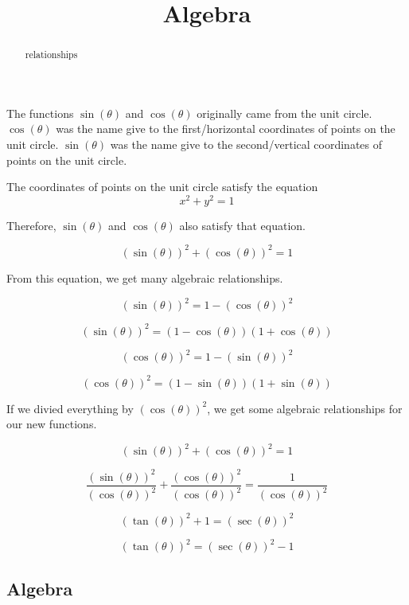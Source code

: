 \documentclass{ximera}
\title{Algebra}
\begin{document}
\begin{abstract}
relationships
\end{abstract}
\maketitle







The functions $\sin(\theta)$ and $\cos(\theta)$ originally came from the unit circle.  $\cos(\theta)$ was the name give to the first/horizontal coordinates of points on the unit circle.   $\sin(\theta)$ was the name give to the second/vertical coordinates of points on the unit circle. 


The coordinates of points on the unit circle satisfy the equation
\[
x^2 + y^2 = 1
\]


Therefore, $\sin(\theta)$ and $\cos(\theta)$ also satisfy that equation.


\[
(\sin(\theta))^2 + (\cos(\theta))^2 = 1
\]


From this equation, we get many algebraic relationships.



\[
(\sin(\theta))^2  = 1 - (\cos(\theta))^2
\]


\[
(\sin(\theta))^2  = (1 - \cos(\theta))  (1 + \cos(\theta))
\]




\[
(\cos(\theta))^2  = 1 - (\sin(\theta))^2
\]


\[
(\cos(\theta))^2  = (1 - \sin(\theta))  (1 + \sin(\theta))
\]



If we divied everything by $(\cos(\theta))^2$, we get some algebraic relationships for our new functions.


\[
(\sin(\theta))^2 + (\cos(\theta))^2 = 1
\]


\[
\frac{(\sin(\theta))^2}{(\cos(\theta))^2} + \frac{(\cos(\theta))^2}{(\cos(\theta))^2} = \frac{1}{(\cos(\theta))^2}
\]


\[
(\tan(\theta))^2 + 1 = (\sec(\theta))^2
\]


\[
(\tan(\theta))^2  = (\sec(\theta))^2 - 1
\]





\subsection*{Algebra}
\end{document}
